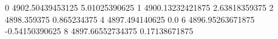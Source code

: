 0 4902.50439453125 5.01025390625
1 4900.13232421875 2.63818359375
2 4898.359375 0.865234375
4 4897.494140625 0.0
6 4896.95263671875 -0.54150390625
8 4897.66552734375 0.17138671875
